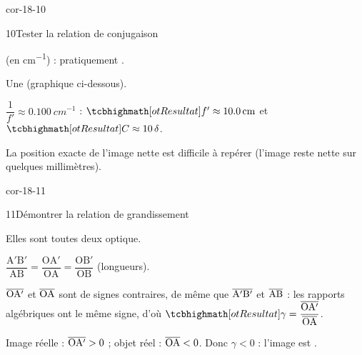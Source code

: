 \begin{blocLivre}{cor-18-10}
\begin{corrige}{10}{Tester la relation de conjugaison}
\begin{questions}
\item {} (en \unit{cm^{-1}}) : pratiquement .
\item Une  (graphique ci-dessous).
\item $\dfrac{1}{f'}\approx\qty{0,100}{cm^{-1}}$ : $\res{f'\approx\qty{10,0}{cm}}$ et $\res{C\approx\num{10}\,\delta}$.
\item La position exacte de l'image nette est difficile à repérer (l'image reste nette sur quelques millimètres).
\end{questions}
\end{corrige}
\end{blocLivre}
\begin{blocLivre}{cor-18-11}
\begin{corrige}{11}{Démontrer la relation de grandissement}
\begin{questions}
\item Elles sont toutes deux  optique.
\item $\dfrac{\mathrm{A'B'}}{\mathrm{AB}}=\dfrac{\mathrm{OA'}}{\mathrm{OA}}=\dfrac{\mathrm{OB'}}{\mathrm{OB}}$ (longueurs).
\item $\overline{\mathrm{OA'}}$ et $\overline{\mathrm{OA}}$ sont de signes contraires, de même que $\overline{\mathrm{A'B'}}$ et $\overline{\mathrm{AB}}$ : les rapports algébriques ont le même signe, d'où $\res{\gamma=\dfrac{\alg{OA'}}{\alg{OA}}}$.
\item Image réelle : $\overline{\mathrm{OA'}}>0$ ; objet réel : $\overline{\mathrm{OA}}<0$. Donc $\gamma<0$ : l'image est .
\end{questions}
\end{corrige}
\end{blocLivre}
